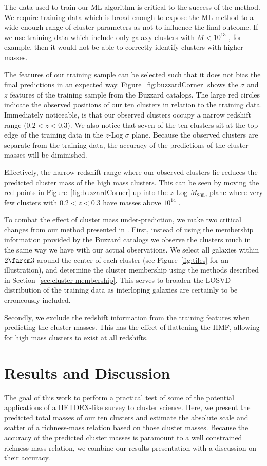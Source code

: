 The data used to train our ML algorithm is critical to the success of the method. We require training data which is broad enough to expose the ML method to a wide enough range of cluster parameters as not to influence the final outcome. If we use training data which include only galaxy clusters with $M < 10^{13}$ \Msol, for example, then it would not be able to correctly identify clusters with higher masses. 

The features of our training sample can be selected such that it does not bias the final predictions in an expected way. Figure~\ref{fig:buzzardCorner} shows the $\sigma$ and $z$ features of the training sample from the Buzzard catalogs. The large red circles indicate the observed positions of our ten clusters in relation to the training data. Immediately noticeable, is that our observed clusters occupy a narrow redshift range ($0.2< z <0.3$). We also notice that seven of the ten clusters sit at the top edge of the training data in the $z$-Log $\sigma$ plane. Because the observed clusters are separate from the training data, the accuracy of the predictions of the cluster masses will be diminished. 

Effectively, the narrow redshift range where our observed clusters lie reduces the predicted cluster mass of the high mass clusters. This can be seen by moving the red points in Figure~\ref{fig:buzzardCorner} up into the $z$-Log $M_{200c}$ plane where very few clusters with $0.2< z <0.3$ have masses above $10^{14}$ \Msol.

To combat the effect of cluster mass under-prediction, we make two critical changes from our method presented in . First, instead of using the membership information provided by the Buzzard catalogs we observe the clusters much in the same way we have with our actual observations. We select all galaxies within $2\farcm3$ around the center of each cluster (see Figure~\ref{fig:tiles} for an illustration), and determine the cluster membership using the methods described in Section~\ref{sec:cluster membership}. This serves to broaden the LOSVD distribution of the training data as interloping galaxies are certainly to be erroneously included.

Secondly, we exclude the redshift information from the training features when predicting the cluster masses. This has the effect of flattening the HMF, allowing for high mass clusters to exist at all redshifts. 

\section{Results and Discussion}\label{sec:results}
The goal of this work to perform a practical test of some of the potential applications of a HETDEX-like survey to cluster science. Here, we present the predicted total masses of our ten clusters and estimate the absolute scale and scatter of a richness-mass relation based on those cluster masses. Because the accuracy of the predicted cluster masses is paramount to a well constrained richness-mass relation, we combine our results presentation with a discussion on their accuracy. 
 
